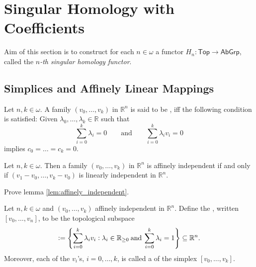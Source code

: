\section*{Singular Homology with Coefficients}

Aim of this section is to construct for each $n \in \omega$ a functor $H_n : \mathsf{Top} \to \mathsf{AbGrp}$, called the \textit{$n$-th singular homology functor}.

\subsection*{Simplices and Affinely Linear Mappings}

\begin{definition}
	Let $n,k \in \omega$. A family $(v_0,\dots,v_k)$ in $\mathbb{R}^n$ is said to be , iff the following condition is satisfied: Given $\lambda_0,\dots,\lambda_k \in \mathbb{R}$ such that
	\begin{equation*}
		\sum_{i = 0}^k \lambda_i = 0 \qquad \text{and} \qquad \sum_{i = 0}^k \lambda_i v_i = 0
	\end{equation*}
	\noindent implies $c_0 = \dots = c_k = 0$.
\end{definition}

\begin{lemma}
	\label{lem:affinely_independent}
	Let $n,k \in \omega$. Then a family $(v_0,\dots,v_k)$ in $\mathbb{R}^n$ is affinely independent if and only if $(v_1 - v_0,\dots,v_k - v_0)$ is linearly independent in $\mathbb{R}^n$.
\end{lemma}

\begin{exercise}
	\label{ex:affinely_independent}
	Prove lemma \ref{lem:affinely_independent}.
\end{exercise}

\begin{definition}[Simplex]
	\label{def:simplex}
	Let $n,k \in \omega$ and $(v_0,\dots,v_k)$ affinely independent in $\mathbb{R}^n$. Define the , written $[v_0,\dots,v_n]$, to be the topological subspace 
	\begin{equation*}
		[v_0,\dots,v_k] := \cbr[4]{\sum_{i = 0}^k \lambda_i v_i : \lambda_i \in \mathbb{R}_{\geq 0} \> \text{and} \> \sum_{i = 0}^k \lambda_i = 1} \subseteq \mathbb{R}^n.
	\end{equation*}
	Moreover, each of the $v_i$'s, $i = 0,\dots,k$, is called a  of the simplex $[v_0,\dots,v_k]$.
\end{definition}

